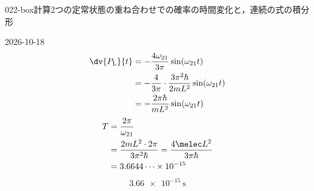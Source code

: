 \documentclass[uplatex,dvipdfmx,a4paper,11pt]{jsarticle}
\begin{document}
\begin{mondai}{022-box}{計算}{2つの定常状態の重ね合わせでの確率の時間変化と，連続の式の積分形}
\begin{kotaeutsushi}{2026-10-18}
\begin{align*}
\dv{P_{\mathrm{L}}}{t}&=-\frac{4\omega_{21}}{3\pi}\sin(\omega_{21}t)\\
&=-\frac{4}{3\pi}\cdot\frac{3\pi^{2}\hbar}{2mL^{2}}\sin(\omega_{21}t)\\
&=-\frac{2\pi\hbar}{mL^{2}}\sin(\omega_{21}t)
\end{align*}
\begin{align*}
T&=\frac{2\pi}{\omega_{21}}\\
&=\frac{2mL^{2}\cdot2\pi}{3\pi^{2}\hbar}=\frac{4\melec L^{2}}{3\pi\hbar}\\
&=3.6644\cdots\times10^{-15}
\end{align*}
\[ \qty{3.66e-15}{\second} \]
\end{kotaeutsushi}
\end{mondai}

\end{document}

